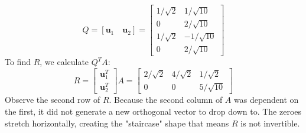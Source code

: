 \documentclass[../linear-algebra.tex]{subfiles}
\begin{document}
$$Q = [\mathbf{u}_1 \quad \mathbf{u}_2] = \begin{bmatrix} 1/\sqrt{2} & 1/\sqrt{10} \\ 0 & 2/\sqrt{10} \\ 1/\sqrt{2} & -1/\sqrt{10} \\ 0 & 2/\sqrt{10} \end{bmatrix}$$
To find $R$, we calculate $Q^T A$:
$$R = \begin{bmatrix} \mathbf{u}_1^T \\ \mathbf{u}_2^T \end{bmatrix} A = \begin{bmatrix} 2/\sqrt{2} & 4/\sqrt{2} & 1/\sqrt{2} \\ 0 & 0 & 5/\sqrt{10} \end{bmatrix}$$
Observe the second row of $R$. Because the second column of $A$ was dependent on the first, it did not generate a new orthogonal vector to drop down to. The zeroes stretch horizontally, creating the "staircase" shape that means $R$ is not invertible.
\end{document}
